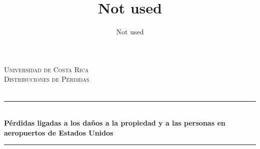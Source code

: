 \documentclass[
  letterpaper,
  onepage,
  openany]{scrreprt}
\title{Not used}
\author{Not used}
\date{}
\begin{document}
  \begin{titlepage}


  	\newcommand{\HRule}{\rule{\linewidth}{0.5mm}} %
  	
  	\center %
  	
  	
  	\textsc{\LARGE Universidad de Costa Rica}\\[1.5cm] %
  	
  	\textsc{\Large Distribuciones de Pérdidas}\\[0.5cm] %
  	
  	\textsc{\large }\\[0.5cm] %
  	
  	
  	\HRule\\[0.4cm]
  	
  	{\huge\bfseries Pérdidas ligadas a los daños a la propiedad y a las personas en aeropuertos de Estados Unidos }\\[0.4cm] %
  	
  	\HRule\\[1.5cm]
  	
  	
  	

\end{titlepage}
\end{document}
